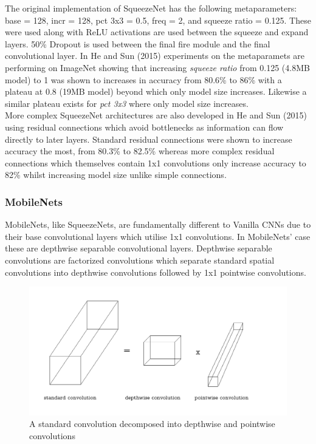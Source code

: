\documentclass{article}
\begin{document}
The original implementation of SqueezeNet has the following metaparameters: base = 128, incr = 128, pct 3x3 = 0.5, freq = 2, and squeeze ratio = 0.125. These were used along with ReLU activations are used between the squeeze and expand layers. 50\% Dropout is used between the final fire module and the final convolutional layer. In He and Sun (2015) experiments on the metaparamets are performing on ImageNet showing that increasing \emph{squeeze ratio} from 0.125 (4.8MB model) to 1 was shown to increases in accuracy from 80.6\% to 86\% with a plateau at 0.8 (19MB model) beyond which only model size increases. Likewise a similar plateau exists for \emph{pct 3x3} where only model size increases.\\

More complex SqueezeNet architectures are also developed in He and Sun (2015) using residual connections which avoid bottlenecks as information can flow directly to later layers. Standard residual connections were shown to increase accuracy the most, from 80.3\% to 82.5\% whereas more complex residual connections which themselves contain 1x1 convolutions only increase accuracy to 82\% whilst increasing model size unlike simple connections.\\

\subsubsection{MobileNets}

MobileNets, like SqueezeNets, are fundamentally different to Vanilla CNNs due to their base convolutional layers which utilise 1x1 convolutions. In MobileNets' case these are depthwise separable convolutional layers. Depthwise separable convolutions are factorized convolutions which separate standard spatial convolutions into depthwise convolutions followed by 1x1 pointwise convolutions.\\

\begin{figure}[!b]
  \includegraphics[width=\linewidth]{separableconv.pdf}
  \caption{A standard convolution decomposed into depthwise and pointwise convolutions}
  \label{fig:dwconvolution}
\end{figure}
\end{document}
